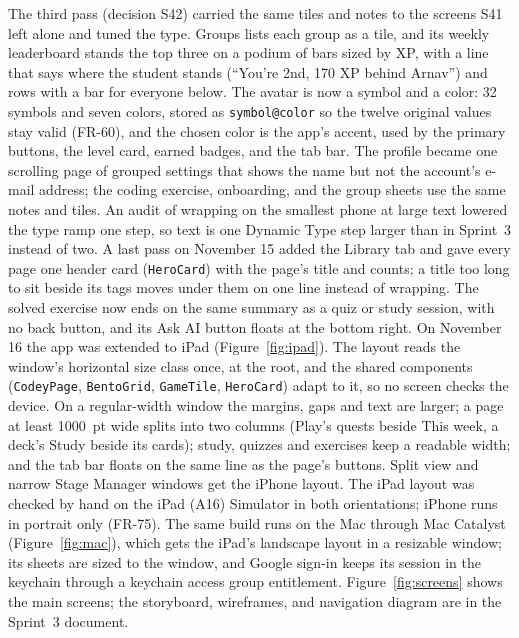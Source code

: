 \documentclass[12pt,letterpaper]{article}
\begin{document}
The third pass (decision S42) carried the same tiles and notes to the screens S41 left
alone and tuned the type. Groups lists each group as a tile, and its weekly
leaderboard stands the top three on a podium of bars sized by XP, with a line that says
where the student stands (``You're 2nd, 170 XP behind Arnav'') and rows with a bar
for everyone below. The avatar is now a symbol and a color: 32 symbols and seven
colors, stored as \texttt{symbol@color} so the twelve original values stay valid
(FR-60), and the chosen color is the app's accent, used by the primary buttons, the
level card, earned badges, and the tab bar. The profile became one scrolling page of
grouped settings that shows the name but not the account's e-mail address; the
coding exercise, onboarding, and the group sheets use the same notes and tiles. An
audit of wrapping on the smallest phone at large text lowered the type ramp one step,
so text is one Dynamic Type step larger than in Sprint~3 instead of two.
A last pass on November 15 added the Library tab and gave every page one header card
(\texttt{HeroCard}) with the page's title and counts; a title too long to sit beside
its tags moves under them on one line instead of wrapping. The solved exercise now
ends on the same summary as a quiz or study session, with no back button, and its
Ask AI button floats at the bottom right.
On November 16 the app was extended to iPad (Figure~\ref{fig:ipad}). The layout
reads the window's horizontal size class once, at the root, and the shared
components (\texttt{CodeyPage}, \texttt{BentoGrid}, \texttt{GameTile},
\texttt{HeroCard}) adapt to it, so no screen checks the device. On a regular-width
window the margins, gaps and text are larger; a page at least 1000~pt wide splits
into two columns (Play's quests beside This week, a deck's Study beside its cards);
study, quizzes and exercises keep a readable width; and the tab bar floats on the
same line as the page's buttons. Split view and narrow Stage Manager windows get
the iPhone layout. The iPad layout was checked by hand on the iPad (A16) Simulator in
both orientations; iPhone runs in portrait only (FR-75). The same build runs on the Mac through Mac Catalyst
(Figure~\ref{fig:mac}), which gets the iPad's landscape layout in a resizable window;
its sheets are sized to the window, and Google sign-in keeps its session in the
keychain through a keychain access group entitlement.
Figure~\ref{fig:screens} shows the main screens; the
storyboard, wireframes, and navigation diagram are in the Sprint~3 document.
\end{document}
